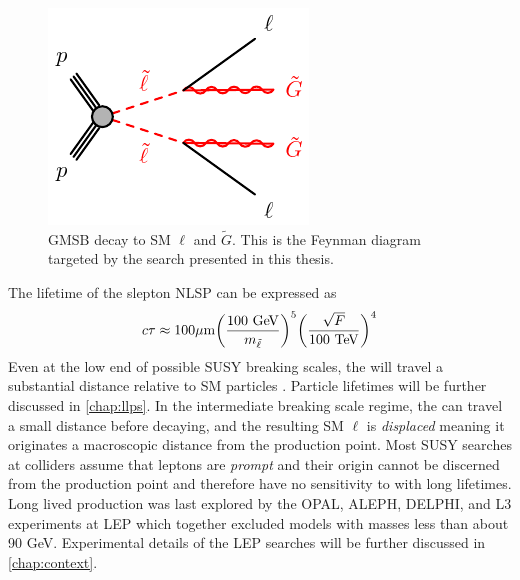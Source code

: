 \begin{figure}[!h]
\centering
\includegraphics[width=.4\textwidth]{figures/theory/slsl-llGG-GMSB.pdf}
\caption{\ac{GMSB} \slep decay to \ac{SM} $\ell$ and $\tilde{G}$. This is the Feynman diagram targeted by the search presented in this thesis.}
\label{fig:feynman}
\end{figure}


The lifetime of the slepton \ac{NLSP} can be expressed as~\cite{jesseshelton}
\begin{equation}
   c \tau \approx 100 \um \bigg(\frac{100 \GeV}{m_{\slep}}\bigg)^5\bigg(\frac{\sqrt{F}}{100 \TeV}\bigg)^4
\label{eq:lt}
\end{equation}
Even at the low end of possible \ac{SUSY} breaking scales, the \slep will travel a substantial distance relative to \ac{SM} particles \cite{jesseshelton}. Particle lifetimes will be further discussed in \autoref{chap:llps}. In the intermediate breaking scale regime, the \slep can travel a small distance before decaying, and the resulting \ac{SM} $\ell$ is \emph{displaced} meaning it originates a macroscopic distance from the \slep production point. Most \ac{SUSY} searches at colliders assume that leptons are \emph{prompt} and their origin cannot be discerned from the \slep production point and therefore have no sensitivity to \slep with long lifetimes. Long lived \slep production was last explored by the OPAL, ALEPH, DELPHI, and L3 experiments at \ac{LEP} which together excluded models with \slep masses less than about 90 GeV. Experimental details of the LEP searches will be further discussed in \autoref{chap:context}.


